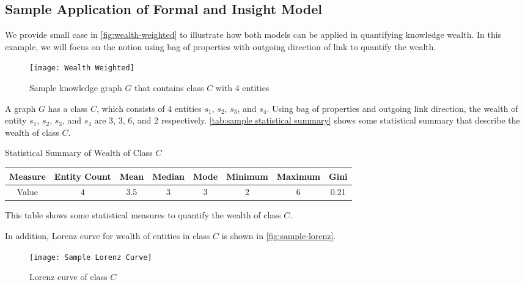 \subsection{Sample Application of Formal and Insight Model}

We provide small case in \autoref{fig:wealth-weighted} to illustrate how both models can be applied in quantifying knowledge wealth. In this example, we will focus on the notion using bag of properties with outgoing direction of link to quantify the wealth.

\begin{figure}[!h]
    \centering
    \texttt{[image: Wealth Weighted]}
    \caption{Sample knowledge graph \(G\) that contains class \(C\) with 4 entities} \label{fig:wealth-weighted}
\end{figure}

A graph \(G\) has a class \(C\), which consists of 4 entities \(s_1\), \(s_2\), \(s_3\), and \(s_4\). Using bag of properties and outgoing link direction, the wealth of entity \(s_1\), \(s_2\), \(s_3\), and \(s_4\) are 3, 3, 6, and 2 respectively. \autoref{tab:sample statistical summary} shows some statistical summary that describe the wealth of class \(C\).

\begin{center}
    \small
    \begin{threeparttable}
    \caption{Statistical Summary of Wealth of Class \(C\)}
    \label{tab:sample statistical summary}
    \begin{tabular}{c | c c c c c c c} 
    
    \toprule
        Measure & Entity Count & Mean & Median & Mode & Minimum & Maximum & Gini \\ [0.5ex] 
    \midrule
        Value & 4 & 3.5 & 3 & 3 & 2 & 6 & 0.21 \\
        [0.5ex]
    \bottomrule
    \end{tabular}
    \begin{tablenotes}
        \footnotesize
        \item{This table shows some statistical measures to quantify the wealth of class \(C\).}
    \end{tablenotes}
    \end{threeparttable}
\end{center}

In addition, Lorenz curve for wealth of entities in class \(C\) is shown in \autoref{fig:sample-lorenz}.

\begin{figure}[!h]
    \centering
    \texttt{[image: Sample Lorenz Curve]}
    \caption{Lorenz curve of class \(C\)} \label{fig:sample-lorenz}
\end{figure}